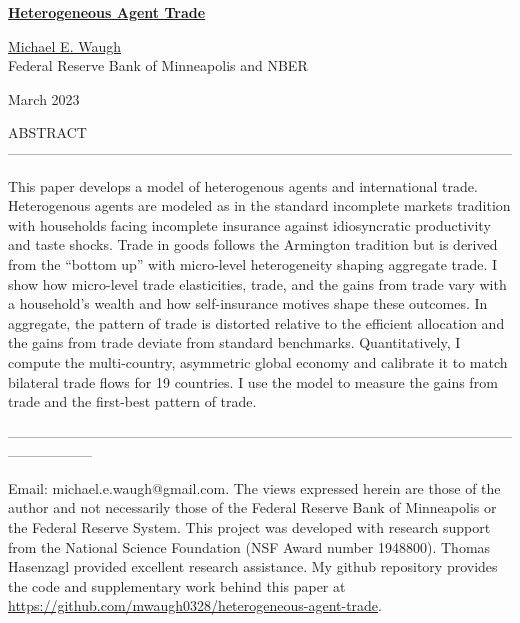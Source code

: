 \documentclass[12pt,pdftex]{article}
\begin{document}
\begin{onehalfspacing}

{\large \textbf{\href{http://www.waugheconomics.com/}{Heterogeneous Agent Trade}}}

\vspace{0.5cm}

\href{http://www.waugheconomics.com/}{Michael E. Waugh} \\ Federal Reserve Bank of Minneapolis and NBER

\vspace{0.5cm}

March 2023

\vspace{1.5cm}


\normalsize

ABSTRACT ------------------------------------------------------------------------------------------------------------

This paper develops a model of heterogenous agents and international trade. Heterogenous agents are modeled as in the standard incomplete markets tradition with households facing incomplete insurance against idiosyncratic productivity and taste shocks. Trade in goods follows the Armington tradition but is derived from the ``bottom up'' with micro-level heterogeneity shaping aggregate trade. I show how micro-level trade elasticities, trade, and the gains from trade vary with a household's wealth and how self-insurance motives shape these outcomes. In aggregate, the pattern of trade is distorted relative to the efficient allocation and the gains from trade deviate from standard benchmarks. Quantitatively, I compute the multi-country, asymmetric global economy and calibrate it to match bilateral trade flows for 19 countries. I use the model to measure the gains from trade and the first-best pattern of trade.

------------------------------------------------------------------------------------------------------------------------------
%

\vspace{6.0cm}

\footnotesize Email: michael.e.waugh@gmail.com. The views expressed herein are those of the author and not necessarily those of the Federal Reserve Bank of Minneapolis or the Federal Reserve System. This project was developed with research support from the National Science Foundation (NSF Award number 1948800). Thomas Hasenzagl provided excellent research assistance. My github repository provides the code and supplementary work behind this paper at \url{https://github.com/mwaugh0328/heterogeneous-agent-trade}.


\end{onehalfspacing}
\end{document}
